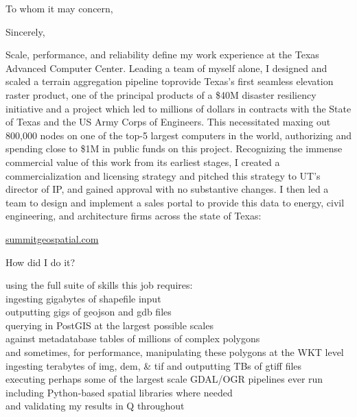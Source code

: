 \documentclass[letterpaper,10pt,colorlinks,linkcolor=cyan]{moderncv}
\begin{document}
  \hypersetup{urlcolor=links}
  \makecvtitle
  \date{December 6, 2023}
  \opening{To whom it may concern,}
  \closing{Sincerely,}
  \makelettertitle
%
Scale, performance, and reliability define my work experience at the Texas Advanced Computer Center. 
Leading a team of myself alone, I designed and scaled a terrain aggregation pipeline toprovide Texas's first seamless elevation raster product, one of the principal products of a \$40M disaster resiliency initiative and a project which led to millions of dollars in contracts with the State of Texas and the US Army Corps of Engineers.
This necessitated maxing out 800,000 nodes on one of the top-5 largest computers in the world, authorizing and spending close to \$1M in public funds on this project. 
Recognizing the immense commercial value of this work from its earliest stages, I created a commercialization and licensing strategy and pitched this strategy to UT's director of IP, and gained approval with no substantive changes. 
I then led a team to design and implement a sales portal to provide this data to energy, civil engineering, and architecture firms across the state of Texas:

\href{https://summitgeospatial.com}{summitgeospatial.com}

How did I do it?

using the full suite of skills this job requires:\\
\faHandPointRight[regular] ingesting gigabytes of shapefile input\\
\faHandPointRight[regular] outputting gigs of geojson and gdb files\\
\faHandPointRight[regular] querying in PostGIS at the largest possible scales\\
\faHandPointRight[regular] against metadatabase tables of millions of complex polygons\\
\faHandPointRight[regular] and sometimes, for performance, manipulating these polygons at the WKT level\\
\faHandPointRight[regular] ingesting terabytes of img, dem, \& tif and outputting TBs of gtiff files\\
\faHandPointRight[regular] executing perhaps some of the largest scale GDAL/OGR pipelines ever run\\
\faHandPointRight[regular] including Python-based spatial libraries where needed\\
\faHandPointRight[regular] and validating my results in Q throughout
\end{document}
